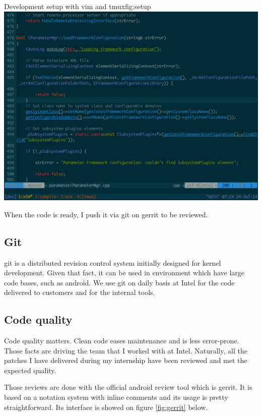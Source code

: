 \begin{figureGraphics}{Development setup with vim and tmux}{fig:setup}
    \includegraphics[width=\textwidth]{./src/img/setup.pdf}
\end{figureGraphics}

When the code is ready, I push it via \gls{git} on \gls{gerrit} to be reviewed.

\subsection{Git}
\gls{git} is a distributed revision control system initially designed for kernel
development. Given that fact, it can be used in environment which have large
code bases, such as \gls{android}. We use \gls{git} on daily basis at Intel for the
code delivered to customers and for the internal tools.

\subsection{Code quality}\label{sec:quality}
Code quality matters. Clean code eases maintenance and is less error-prone.
Those facts are driving the team that I worked with at Intel. Naturally, all the
patches I have delivered during my internship have been reviewed and met the
expected quality.

Those reviews are done with the official \gls{android} review tool which is \gls{gerrit}.
It is based on a notation system with inline comments and its usage is pretty straightforward.
Its interface is showed on figure \ref{fig:gerrit} below.


